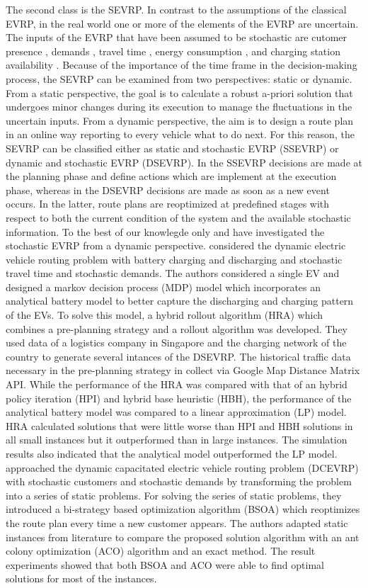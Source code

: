 \documentclass[11pt]{article}
\begin{document}
The second class is the SEVRP. In contrast to the assumptions of the classical EVRP, in the real world one or more of the elements of the EVRP are uncertain. The inputs of the EVRP that have been assumed to be stochastic are cutomer presence \citep{Shi2019}, demands \citep{Lu2019}, travel time \citep{Shao2017}, energy consumption \citep{Pelletier2019}, and charging station availability \citep{Sweda2017}. Because of the importance of the time frame in the decision-making process, the SEVRP can be examined from two perspectives: static or dynamic. From a static perspective, the goal is to calculate a robust a-priori solution that undergoes minor changes during its execution to manage the fluctuations in the uncertain inputs. From a dynamic perspective, the aim is to design a route plan in an online way reporting to every vehicle what to do next. For this reason, the SEVRP can be classified either as static and stochastic EVRP (SSEVRP) or dynamic and stochastic EVRP (DSEVRP). In the SSEVRP decisions are made at the planning phase and define actions which are implement at the execution phase, whereas in the  DSEVRP decisions are made as soon as a new event occurs. In the latter, route plans are reoptimized at predefined stages with respect to both the current condition of the system and the available stochastic information. To the best of our knowlegde only \cite{Bi2019} and \cite{Lu2019} have investigated the stochastic EVRP from a dynamic perspective. \cite{Bi2019} considered the dynamic electric vehicle routing problem with battery charging and discharging and stochastic travel time and stochastic demands. The authors considered a single EV and designed a markov decision process (MDP) model which incorporates an analytical battery model to better capture the discharging and charging pattern of the EVs. To solve this model, a hybrid rollout algorithm (HRA) which combines a pre-planning strategy and a rollout algorithm was developed. They used data of a logistics company in Singapore and the charging network of the country to generate several intances of the DSEVRP. The historical traffic data necessary in the   pre-planning strategy in collect via Google Map Distance Matrix API. While the performance of the HRA was compared with that of an hybrid policy iteration (HPI) and hybrid base heuristic (HBH), the performance of the analytical battery model was compared to a linear approximation (LP) model. HRA calculated solutions that were little worse than HPI and HBH solutions in all small instances but it outperformed than in large instances. The simulation results also indicated that the analytical model outperformed the LP model. \cite{Lu2019} approached the dynamic capacitated electric vehicle routing problem (DCEVRP) with stochastic customers and stochastic demands by transforming the problem into a series of static problems. For solving the series of static problems, they introduced a bi-strategy based optimization algorithm (BSOA) which reoptimizes the route plan every time a new customer appears. The authors adapted static instances from literature to compare the proposed solution algorithm with an ant colony optimization (ACO) algorithm and an exact method. The result experiments showed that both BSOA and ACO were able to find optimal solutions for most of the instances. 
\end{document}
